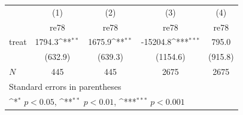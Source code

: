 {
\def\sym#1{\ifmmode^{#1}\else\(^{#1}\)\fi}
\begin{tabular}{l*{4}{c}}
\hline\hline
            &\multicolumn{1}{c}{(1)}&\multicolumn{1}{c}{(2)}&\multicolumn{1}{c}{(3)}&\multicolumn{1}{c}{(4)}\\
            &\multicolumn{1}{c}{re78}&\multicolumn{1}{c}{re78}&\multicolumn{1}{c}{re78}&\multicolumn{1}{c}{re78}\\
\hline
treat       &      1794.3\sym{**} &      1675.9\sym{**} &    -15204.8\sym{***}&       795.0         \\
            &     (632.9)         &     (639.3)         &    (1154.6)         &     (915.8)         \\
\hline
\(N\)       &         445         &         445         &        2675         &        2675         \\
\hline\hline
\multicolumn{5}{l}{\footnotesize Standard errors in parentheses}\\
\multicolumn{5}{l}{\footnotesize \sym{*} \(p<0.05\), \sym{**} \(p<0.01\), \sym{***} \(p<0.001\)}\\
\end{tabular}
}
